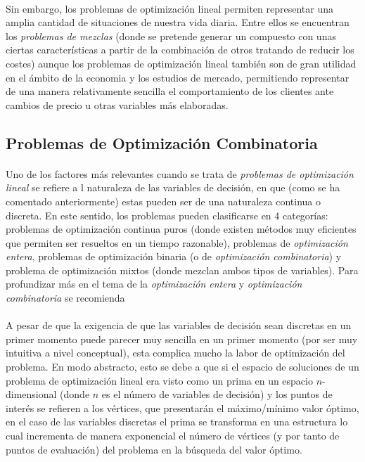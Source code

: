 \documentclass{subfiles}
\begin{document}
        \paragraph{}
        Sin embargo, los problemas de optimización lineal permiten representar una amplia cantidad de situaciones de nuestra vida diaria. Entre ellos se encuentran los \emph{problemas de mezclas} (donde se pretende generar un compuesto con unas ciertas características a partir de la combinación de otros tratando de reducir los costes) aunque los problemas de optimización lineal también son de gran utilidad en el ámbito de la economia y los estudios de mercado, permitiendo representar de una manera relativamente sencilla el comportamiento de los clientes ante cambios de precio u otras variables más elaboradas.

      \subsection{Problemas de Optimización Combinatoria}
      \label{sec:formulation_combinatorial_problems}

        \paragraph{}
        Uno de los factores más relevantes cuando se trata de \emph{problemas de optimización lineal} se refiere a l naturaleza de las variables de decisión, en que (como se ha comentado anteriormente) estas pueden ser de una naturaleza continua o discreta. En este sentido, los problemas pueden clasificarse en 4 categorías: problemas de optimización continua puros (donde existen métodos muy eficientes que permiten ser resueltos en un tiempo razonable), problemas de \emph{optimización entera}, problemas de optimización binaria (o de \emph{optimización combinatoria}) y problema de optimización mixtos (donde mezclan ambos tipos de variables). Para profundizar más en el tema de la \emph{optimización entera} y \emph{optimización combinatoria} se recomienda \cite{wolsey2014integer}

        \paragraph{}
        A pesar de que la exigencia de que las variables de decisión sean discretas en un primer momento puede parecer muy sencilla en un primer momento (por ser muy intuitiva a nivel conceptual), esta complica mucho la labor de optimización del problema. En modo abstracto, esto se debe a que si el espacio de soluciones de un problema de optimización lineal era visto como un prima en un espacio $n$-dimensional (donde $n$ es el número de variables de decisión) y los puntos de interés se refieren a los vértices, que presentarán el máximo/mínimo valor óptimo, en el caso de las variables discretas el prima se transforma en una estructura  lo cual incrementa de manera exponencial el número de vértices (y por tanto de puntos de evaluación) del problema en la búsqueda del valor óptimo.
\end{document}
